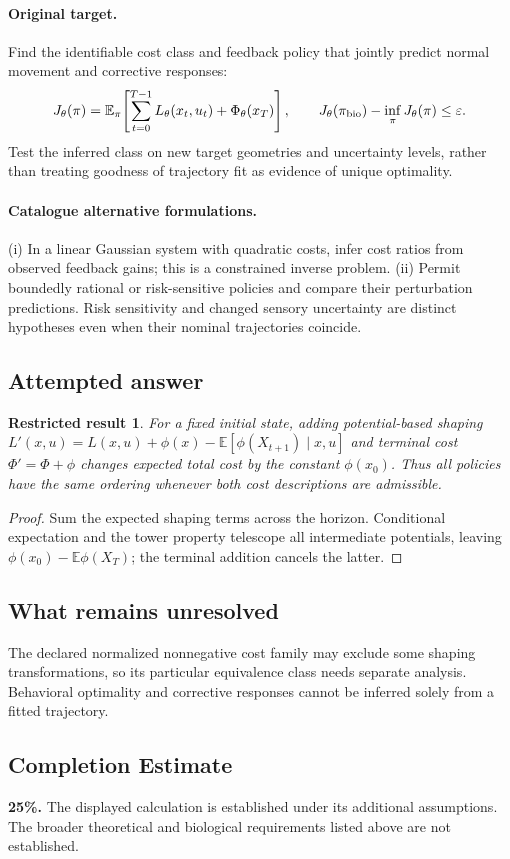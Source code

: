 \documentclass[11pt]{article}
\newcommand{\E}{\mathbb E}
\providecommand{\E}{\mathbb E}
\newtheorem{attemptresult}{Restricted result}[section]
\begin{document}
\paragraph{Original target.}
Find the identifiable cost class and feedback policy that jointly predict normal movement and corrective responses:
\[
J_\theta(\pi)=\E_\pi\!\left[\sum_{t=0}^{T-1}L_\theta(x_t,u_t)+\Phi_\theta(x_T)\right],
\qquad
J_\theta(\pi_{\rm bio})-\inf_\pi J_\theta(\pi)\leq\varepsilon.
\]
Test the inferred class on new target geometries and uncertainty levels, rather than treating goodness of trajectory fit as evidence of unique optimality.
\paragraph{Catalogue alternative formulations.}
(i) In a linear Gaussian system with quadratic costs, infer cost ratios from observed feedback gains; this is a constrained inverse problem. (ii) Permit boundedly rational or risk-sensitive policies and compare their perturbation predictions. Risk sensitivity and changed sensory uncertainty are distinct hypotheses even when their nominal trajectories coincide.
\subsection{Attempted answer}
\begin{attemptresult}
For a fixed initial state, adding potential-based shaping $L\prime(x,u)=L(x,u)+\phi(x)-\E[\phi(X_{t+1})\mid x,u]$ and terminal cost $\Phi\prime=\Phi+\phi$ changes expected total cost by the constant $\phi(x_0)$. Thus all policies have the same ordering whenever both cost descriptions are admissible.
\end{attemptresult}
\begin{proof}
Sum the expected shaping terms across the horizon. Conditional expectation and the tower property telescope all intermediate potentials, leaving $\phi(x_0)-\E\phi(X_T)$; the terminal addition cancels the latter.
\end{proof}
\subsection{What remains unresolved}
The declared normalized nonnegative cost family may exclude some shaping transformations, so its particular equivalence class needs separate analysis. Behavioral optimality and corrective responses cannot be inferred solely from a fitted trajectory.
\subsection{Completion Estimate}
\textbf{25\%.} The displayed calculation is established under its additional assumptions. The broader theoretical and biological requirements listed above are not established.
\end{document}
